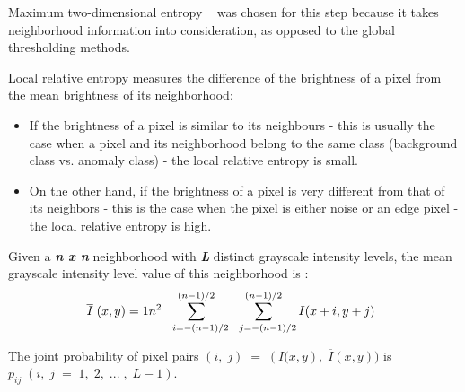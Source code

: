 \documentclass[3p,,preprint,review,12pt]{elsarticle}
\begin{document}
Maximum two-dimensional entropy \unskip~\cite{981091:21201211} was chosen for this step because it takes neighborhood information into consideration, as opposed to the global thresholding methods. 

Local relative entropy measures the difference of the brightness of a pixel from the mean brightness of its neighborhood: 



\begin{itemize}
  \item \relax  If the brightness of a pixel is similar to its neighbours - this is usually the case when a pixel and its neighborhood belong to the same class (background class vs. anomaly class) - the local relative entropy is small.
  \item \relax On the other hand, if the brightness of a pixel is very different from that of its neighbors - this is the case when the pixel is either noise or an edge pixel - the local relative entropy is high. 
\end{itemize}
  Given a \textbf{\textit{n x n}} neighborhood with \textbf{\textit{L}} distinct grayscale intensity levels, the mean grayscale intensity level value of this neighborhood is :
\let\saveeqnno\theequation
\let\savefrac\frac
\def\dispfrac{\displaystyle\savefrac}
\begin{eqnarray}
\let\frac\dispfrac
\gdef\theequation{10}
\let\theHequation\theequation
\label{dfg-d6381740ba27}
\begin{array}{@{}l}\overline I\;(x,y)=\frac1{n^{2}}\sum_{\;\;\;i=-(n-1)/2}^{(n-1)/2}\sum_{\;\;\;j=-(n-1)/2}^{(n-1)/2}I(x+i,y+j)\end{array}
\end{eqnarray}
\global\let\theequation\saveeqnno
\addtocounter{equation}{-1}\ignorespaces 
The joint probability of pixel pairs $(i,\;j)\;=\;\left(I(x,y\right),\;\overline I(x,y)) $ is $p_{ij}\;(i,\;j\;=\;1,\;2,\;...\;,\;L-1) $.
\end{document}
